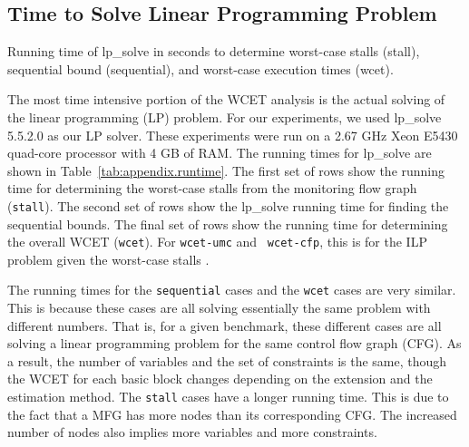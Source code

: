 

\subsection{Time to Solve Linear Programming Problem}
\label{sec:lptime}

\begin{table}[htb]
  \begin{center}
    \begin{small}
    
    \end{small}
    \vspace{-0.1in}
    \caption{Running time of lp\_solve in seconds to determine worst-case stalls
    (stall), sequential bound (sequential), and worst-case execution times (wcet).}
    \label{tab:appendix.runtime}
    \vspace{-0.2in}
  \end{center}
\end{table}

The most time intensive portion of the WCET analysis is the actual solving of
the linear programming (LP) problem. For our experiments, we used lp\_solve
5.5.2.0 \cite{lpsolve} as our LP solver. These experiments were run on a 2.67
GHz Xeon E5430 quad-core processor with 4 GB of RAM. The running times for
lp\_solve are shown in Table~\ref{tab:appendix.runtime}.  The first set of rows
show the running time for determining the worst-case stalls from the monitoring flow
graph ({\tt stall}). The second set of rows show the lp\_solve running time for
finding the sequential bounds. The final set of rows show the running time for
determining the overall WCET ({\tt wcet}). For {\tt wcet-umc} and {\tt
wcet-cfp}, this is for the ILP problem given the worst-case stalls .

The running times for the {\tt sequential} cases and the {\tt wcet} cases are very
similar. This is because these cases are all solving essentially the same
problem with different numbers. That is, for a given benchmark, these different
cases are all solving a linear programming problem for the same control flow
graph (CFG). As a result, the number of variables and the set of
constraints is the same, though the WCET for each basic block changes depending
on the extension and the estimation method. The {\tt stall} cases have a longer
running time.
This is due to the fact that a MFG has more nodes than its corresponding CFG.
The increased number of nodes also implies more variables and more constraints.


